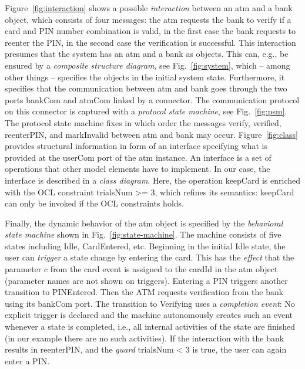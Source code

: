 \documentclass[10pt,fleqn,final]{scrreprt}
\newenvironment{definitions}[0]{\medskip }{}
\newcommand{\uml}[1]{\textsf{#1}}
\begin{document}
\begin{definitions}
Figure~\ref{fig:interaction} shows a possible \emph{interaction}
between an \uml{atm} and a \uml{bank} object, which consists of
four messages: the \uml{atm} requests the \uml{bank} to \uml{verify}
if a card and PIN number combination is valid, in the first case the
\uml{bank} requests to reenter the PIN, in the second case the
verification is successful.  This interaction presumes that the system
has an \uml{atm} and a \uml{bank} as objects. This can, e.g., be
ensured by a \emph{composite structure diagram}, see
Fig.~\ref{fig:system}, which -- among other things -- specifies the
objects in the initial system state.  Furthermore, it specifies that
the communication between \uml{atm} and \uml{bank} goes through the
two ports \uml{bankCom} and \uml{atmCom} linked by a connector.  The
communication protocol on this connector is captured with a
\emph{protocol state machine}, see Fig.~\ref{fig:psm}.  The protocol
state machine fixes in which order the messages \uml{verify},
\uml{verified}, \uml{reenterPIN}, and \uml{markInvalid} between
\uml{atm} and \uml{bank} may occur.  Figure~\ref{fig:class} provides
structural information in form of an interface specifying what is
provided at the \uml{userCom} port of the \uml{atm} instance. An
interface is a set of operations that other model elements have to
implement. In our case, the interface is described in a \emph{class
  diagram}. Here, the operation \uml{keepCard} is enriched with the
OCL constraint \uml{trialsNum >= 3}, which refines its semantics:
\uml{keepCard} can only be invoked if the OCL constraints holds.

Finally, the dynamic behavior of the \uml{atm} object is specified by
the \emph{behavioral state machine} shown in
Fig.~\ref{fig:state-machine}. The machine consists of five states
including \uml{Idle}, \uml{CardEntered}, etc.  Beginning in the
initial \uml{Idle} state, the user can \emph{trigger} a state change
by entering the \uml{card}. This has the \emph{effect} that the
parameter \uml{c} from the \uml{card} event is assigned to the
\uml{cardId} in the \uml{atm} object (parameter names are not shown on
triggers). Entering a \uml{PIN} triggers another transition to
\uml{PINEntered}.  Then the ATM requests verification from the bank
using its \uml{bankCom} port.  The transition to \uml{Verifying} uses
a \emph{completion event}: No explicit trigger is declared and the
machine autonomously creates such an event whenever a state is
completed, i.e., all internal activities of the state are finished (in
our example there are no such activities).  If the interaction with
the bank results in \uml{reenterPIN}, and the \emph{guard}
\uml{trialsNum < 3} is true, the user can again enter a \uml{PIN}.



\end{definitions}
\end{document}
